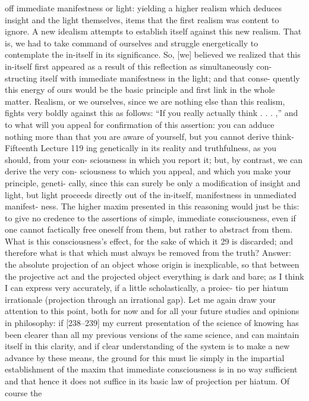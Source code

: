 off immediate manifestness or light: yielding a higher realism which deduces
insight and the light themselves, items that the first realism was content to
ignore. A new idealism attempts to establish itself against this new realism.
That is, we had to take command of ourselves and struggle energetically to
contemplate the in-itself in its significance. So, [we] believed we realized that
this in-itself first appeared as a result of this reflection as simultaneously con-
structing itself with immediate manifestness in the light; and that conse-
quently this energy of ours would be the basic principle and first link in the
whole matter.
Realism, or we ourselves, since we are nothing else than this realism,
fights very boldly against this as follows: “If you really actually think . . . ,” and
to what will you appeal for confirmation of this assertion: you can adduce
nothing more than that you are aware of yourself, but you cannot derive think-Fifteenth Lecture
119
ing genetically in its reality and truthfulness, as you should, from your con-
sciousness in which you report it; but, by contrast, we can derive the very con-
sciousness to which you appeal, and which you make your principle, geneti-
cally, since this can surely be only a modification of insight and light, but light
proceeds directly out of the in-itself, manifestness in unmediated manifest-
ness. The higher maxim presented in this reasoning would just be this: to give
no credence to the assertions of simple, immediate consciousness, even if one
cannot factically free oneself from them, but rather to abstract from them.
What is this consciousness’s effect, for the sake of which it 29 is discarded; and
therefore what is that which must always be removed from the truth? Answer:
the absolute projection of an object whose origin is inexplicable, so that
between the projective act and the projected object everything is dark and
bare; as I think I can express very accurately, if a little scholastically, a proiec-
tio per hiatum irrationale (projection through an irrational gap).
Let me again draw your attention to this point, both for now and for
all your future studies and opinions in philosophy: if [238–239] my current
presentation of the science of knowing has been clearer than all my previous
versions of the same science, and can maintain itself in this clarity, and if
clear understanding of the system is to make a new advance by these means,
the ground for this must lie simply in the impartial establishment of the
maxim that immediate consciousness is in no way sufficient and that hence
it does not suffice in its basic law of projection per hiatum. Of course the
